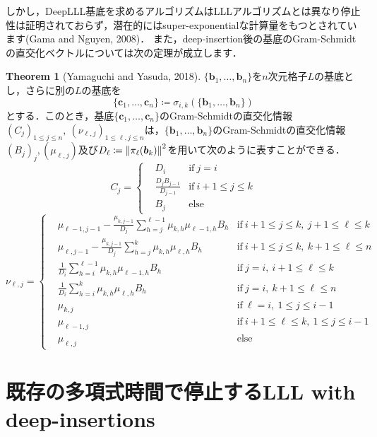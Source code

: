 \documentclass[a4j, dvipdfmx]{jsarticle}
\theoremstyle{definition}
\newtheorem{theorem}[definition]{Theorem}
\begin{document}
しかし，DeepLLL基底を求めるアルゴリズムはLLLアルゴリズムとは異なり停止性は証明されておらず，潜在的にはsuper-exponentialな計算量をもつとされています(Gama and Nguyen, 2008)．
また，deep-insertion後の基底のGram-Schmidtの直交化ベクトルについては次の定理が成立します．

\begin{theorem}[Yamaguchi and Yasuda, 2018]
$\{\boldsymbol{b}_1,\ldots,\boldsymbol{b}_n\}$を$n$次元格子$L$の基底とし，さらに別の$L$の基底を
$$
\{\boldsymbol{c}_1,\ldots,\boldsymbol{c}_n\}\coloneqq \sigma_{i, k}(\{\boldsymbol{b}_1,\ldots,\boldsymbol{b}_n\})
$$
とする．このとき，基底$\{\boldsymbol{c}_1,\ldots,\boldsymbol{c}_n\}$のGram-Schmidtの直交化情報$(C_j)_{1\le j\le n},~(\nu_{\ell, j})_{1\le \ell, j\le n}$は，$\{\boldsymbol{b}_1,\ldots,\boldsymbol{b}_n\}$のGram-Schmidtの直交化情報$(B_j)_j, (\mu_{\ell, j})$及び$D_\ell\coloneqq \norm{\pi_\ell(\boldsymbol{b}_k)}^2$を用いて次のように表すことができる．
$$
C_j=\left\{
\!\!\!\!\!\!\begin{array}{lll}
& D_i & \text{if}~j=i\\
& \displaystyle\frac{D_jB_{j-1}}{D_{j-1}} & \text{if}~i+1\le j\le k\\
& B_j & \text{else}
\end{array}
\right.
$$
$$
\nu_{\ell, j}=\left\{
\!\!\!\!\!\!\begin{array}{lll}
&\displaystyle\mu_{\ell-1, j-1}-\frac{\mu_{k, j-1}}{D_j}\sum_{h=j}^{\ell-1}\mu_{k, h}\mu_{\ell-1, h}B_h & \text{if}~i+1\le j\le k,~j+1\le \ell\le k\\
&\displaystyle \mu_{\ell, j-1}-\frac{\mu_{k, j-1}}{D_j}\sum_{h=j}^k \mu_{k, h}\mu_{\ell, h}B_h & \text{if}~i+1\le j\le k,~k+1\le \ell \le n\\
&\displaystyle \frac{1}{D_i}\sum_{h=i}^{\ell-1}\mu_{k, h}\mu_{\ell-1, h}B_h & \text{if}~j=i,~i+1\le \ell \le k\\
& \displaystyle \frac{1}{D_i}\sum_{h=i}^{k}\mu_{k, h}\mu_{\ell, h}B_h & \text{if}~j=i,~k+1\le \ell\le n\\
& \mu_{k, j} & \text{if}~\ell=i,~1\le j\le i-1\\
& \mu_{\ell-1, j} & \text{if}~i+1\le \ell\le k,~1\le j\le i-1\\
& \mu_{\ell, j} & \text{else}
\end{array}
\right.
$$
\end{theorem} 

\section{既存の多項式時間で停止するLLL with deep-insertions}
\end{document}
